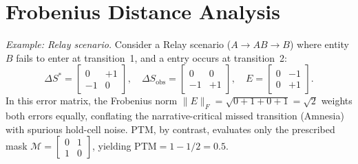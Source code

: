 \documentclass[sigconf,review,anonymous]{acmart}
\begin{document}
\section{Frobenius Distance Analysis}
\label{app:frobenius}



\emph{Example: Relay scenario.}\;
Consider a Relay scenario ($A \!\to\! AB \!\to\! B$) where entity $B$ fails to enter at transition~1, and a entry occurs at transition~2:
\begin{equation}
    \Delta S^* = \begin{bmatrix} 0 & +1 \\ -1 & 0 \end{bmatrix}, \quad
    \Delta S_\text{obs} = \begin{bmatrix} 0 & 0 \\ -1 & +1 \end{bmatrix}, \quad
    E = \begin{bmatrix} 0 & -1 \\ 0 & +1 \end{bmatrix}.
\end{equation}
In this error matrix, the Frobenius norm $\|E\|_F = \sqrt{0 + 1 + 0 + 1} = \sqrt{2}$ weights both errors equally, conflating the narrative-critical missed transition (Amnesia) with spurious hold-cell noise. PTM, by contrast, evaluates only the prescribed mask $\mathcal{M} = \left[ \begin{smallmatrix} 0 & 1 \\ 1 & 0 \end{smallmatrix} \right]$, yielding $\text{PTM} = 1 - 1/2 = 0.5$.
\end{document}
